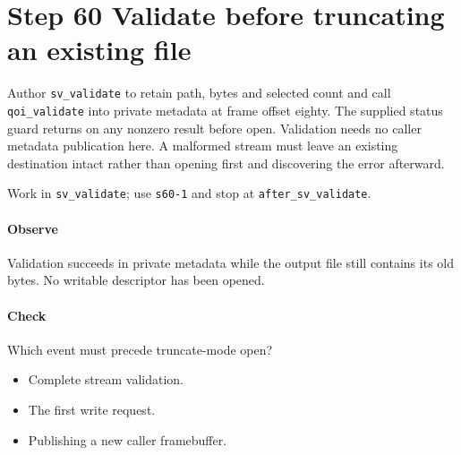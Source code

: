 \section{Step 60 Validate before truncating an existing file}\label{qoi-s60}
Author \texttt{sv\_validate} to retain path, bytes and selected count and call \texttt{qoi\_validate} into private metadata at frame offset eighty. The supplied status guard returns on any nonzero result before open. Validation needs no caller metadata publication here. A malformed stream must leave an existing destination intact rather than opening first and discovering the error afterward.

Work in \texttt{sv\_validate}; use \texttt{s60-1} and stop at \texttt{after\_sv\_validate}.

\paragraph{Observe} Validation succeeds in private metadata while the output file still contains its old bytes. No writable descriptor has been opened.

\paragraph{Check} Which event must precede truncate-mode open?
\begin{itemize}
  \item[A.] Complete stream validation.
  \item[B.] The first write request.
  \item[C.] Publishing a new caller framebuffer.
\end{itemize}
